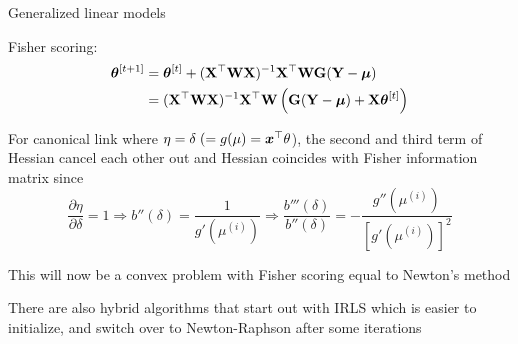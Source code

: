 \documentclass[11pt,compress,t,notes=noshow, xcolor=table]{beamer}
\begin{document}
\begin{framei}[fs=small]{Generalized linear models}
\item Fisher scoring:
\begin{align*}
\bm{\theta}^{[t +1]} &=\bm{\theta}^{[t]} + (\mathbf{X}^\top \mathbf{W} \mathbf{X})^{-1}\mathbf{X}^\top \mathbf{W} \mathbf{G} (\mathbf{Y}-\bm{\mu})\\
& =(\mathbf{X}^\top \mathbf{W} \mathbf{X})^{-1}\mathbf{X}^\top \mathbf{W} \left(\mathbf{G} (\mathbf{Y}-\bm{\mu})+\mathbf{X}\bm{\theta}^{[t]}\right)
\end{align*}
\vfill
\item For canonical link where $\eta = \delta \;(= g(\mu) = \bm{x}^\top\theta$), the second and third term of Hessian cancel each other out and Hessian coincides with Fisher information matrix since
$$\frac{\partial{\eta}}{\partial{\delta}} = 1 \Rightarrow b''(\delta) = \frac{1}{g'(\mu^{(i)})} \Rightarrow  \frac{b'''(\delta)}{b''(\delta)} = -   \frac{g''(\mu^{(i)})}{[g'(\mu^{(i)})]^2}$$
\item This will now be a convex problem with Fisher scoring equal to Newton's method
\vfill
\item There are also hybrid algorithms that start out with IRLS which is easier to initialize, and switch over to Newton-Raphson after some iterations
\end{framei}

\endlecture
\end{document}
